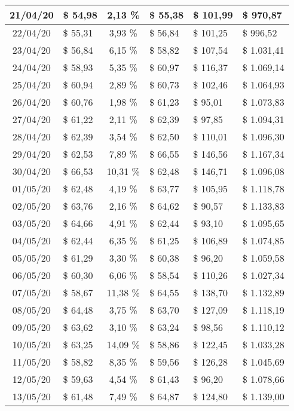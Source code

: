 \begin{center}
\begin{small}
\begin{longtable}{|c|l|c|l|l|l|}
21/04/20 & \$ 54,98 & 2,13 \% & \$ 55,38 & \$ 101,99 & \$ 970,87 \\ \hline
22/04/20 & \$ 55,31 & 3,93 \% & \$ 56,84 & \$ 101,25 & \$ 996,52 \\ \hline
23/04/20 & \$ 56,84 & 6,15 \% & \$ 58,82 & \$ 107,54 & \$ 1.031,41 \\ \hline
24/04/20 & \$ 58,93 & 5,35 \% & \$ 60,97 & \$ 116,37 & \$ 1.069,14 \\ \hline
25/04/20 & \$ 60,94 & 2,89 \% & \$ 60,73 & \$ 102,46 & \$ 1.064,93 \\ \hline
26/04/20 & \$ 60,76 & 1,98 \% & \$ 61,23 & \$ 95,01 & \$ 1.073,83 \\ \hline
27/04/20 & \$ 61,22 & 2,11 \% & \$ 62,39 & \$ 97,85 & \$ 1.094,31 \\ \hline
28/04/20 & \$ 62,39 & 3,54 \% & \$ 62,50 & \$ 110,01 & \$ 1.096,30 \\ \hline
29/04/20 & \$ 62,53 & 7,89 \% & \$ 66,55 & \$ 146,56 & \$ 1.167,34 \\ \hline
30/04/20 & \$ 66,53 & 10,31 \% & \$ 62,48 & \$ 146,71 & \$ 1.096,08 \\ \hline
01/05/20 & \$ 62,48 & 4,19 \% & \$ 63,77 & \$ 105,95 & \$ 1.118,78 \\ \hline
02/05/20 & \$ 63,76 & 2,16 \% & \$ 64,62 & \$ 90,57 & \$ 1.133,83 \\ \hline
03/05/20 & \$ 64,66 & 4,91 \% & \$ 62,44 & \$ 93,10 & \$ 1.095,65 \\ \hline
04/05/20 & \$ 62,44 & 6,35 \% & \$ 61,25 & \$ 106,89 & \$ 1.074,85 \\ \hline
05/05/20 & \$ 61,29 & 3,30 \% & \$ 60,38 & \$ 96,20 & \$ 1.059,58 \\ \hline
06/05/20 & \$ 60,30 & 6,06 \% & \$ 58,54 & \$ 110,26 & \$ 1.027,34 \\ \hline
07/05/20 & \$ 58,67 & 11,38 \% & \$ 64,55 & \$ 138,70 & \$ 1.132,89 \\ \hline
08/05/20 & \$ 64,48 & 3,75 \% & \$ 63,70 & \$ 127,09 & \$ 1.118,19 \\ \hline
09/05/20 & \$ 63,62 & 3,10 \% & \$ 63,24 & \$ 98,56 & \$ 1.110,12 \\ \hline
10/05/20 & \$ 63,25 & 14,09 \% & \$ 58,86 & \$ 122,45 & \$ 1.033,28 \\ \hline
11/05/20 & \$ 58,82 & 8,35 \% & \$ 59,56 & \$ 126,28 & \$ 1.045,69 \\ \hline
12/05/20 & \$ 59,63 & 4,54 \% & \$ 61,43 & \$ 96,20 & \$ 1.078,66 \\ \hline
13/05/20 & \$ 61,48 & 7,49 \% & \$ 64,87 & \$ 124,80 & \$ 1.139,00 \\ \hline

\end{longtable}
\end{small}
\end{center}
